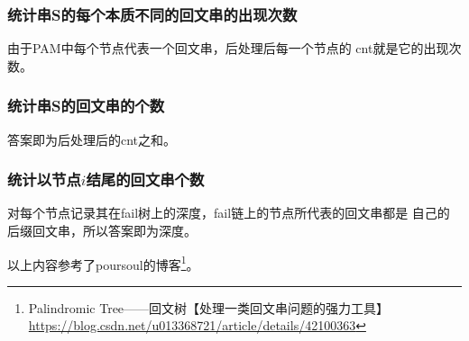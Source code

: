 \subsubsection{统计串S的每个本质不同的回文串的出现次数}
由于PAM中每个节点代表一个回文串，后处理后每一个节点的
cnt就是它的出现次数。
\subsubsection{统计串S的回文串的个数}
答案即为后处理后的cnt之和。
\subsubsection{统计以节点$i$结尾的回文串个数}
对每个节点记录其在fail树上的深度，fail链上的节点所代表的回文串都是
自己的后缀回文串，所以答案即为深度。

以上内容参考了poursoul的博客\footnote{
    Palindromic Tree——回文树【处理一类回文串问题的强力工具】
    \url{https://blog.csdn.net/u013368721/article/details/42100363}
}。
